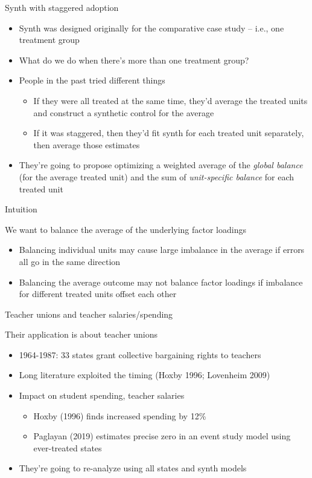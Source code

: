 \documentclass{beamer}
\begin{document}
\begin{frame}{Synth with staggered adoption}

\begin{itemize}
\item Synth was designed originally for the comparative case study -- i.e., one treatment group
\item What do we do when there's more than one treatment group?
\item People in the past tried different things
	\begin{itemize}
	\item If they were all treated at the same time, they'd average the treated units and construct a synthetic control for the average
	\item If it was staggered, then they'd fit synth for each treated unit separately, then average those estimates
	\end{itemize}
\item They're going to propose optimizing a weighted average of the \emph{global balance} (for the average treated unit) and the sum of \emph{unit-specific balance} for each treated unit
\end{itemize}

\end{frame}

\begin{frame}{Intuition}

We want to balance the average of the underlying factor loadings

\begin{itemize}
\item Balancing individual units may cause large imbalance in the average if errors all go in the same direction
\item Balancing the average outcome may not balance factor loadings if imbalance for different treated units offset each other
\end{itemize}

\end{frame}


\begin{frame}{Teacher unions and teacher salaries/spending}

Their application is about teacher unions
\begin{itemize}
\item 1964-1987: 33 states grant collective bargaining rights to teachers
\item Long literature exploited the timing (Hoxby 1996; Lovenheim 2009)
\item Impact on student spending, teacher salaries
	\begin{itemize}
	\item Hoxby (1996) finds increased spending by 12\%
	\item Paglayan (2019) estimates precise zero in an event study model using ever-treated states
	\end{itemize}
\item They're going to re-analyze using all states and synth models
\end{itemize}

\end{frame}
\end{document}
